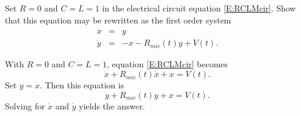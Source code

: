 \documentclass{ximera}
\begin{document}
\begin{exercise} \label{c14.3.4A}
Set $R=0$ and $C=L=1$ in the electrical circuit equation \eqref{E:RCLMcir}. 
Show that this equation may be rewritten as the first order system
\begin{equation} \label{E:ECsy}
\begin{array}{rcl}
\dot{x} & = & y \\
\dot{y} & = & -x -R_{mic}(t)y + V(t).
\end{array} 
\end{equation}

\begin{solution}

With $R=0$ and $C=L=1$, equation \eqref{E:RCLMcir} becomes
\[
\ddot{x} + R_{mic}(t)\dot{x} + x = V(t).
\]
Set $y=\dot{x}$.  Then this equation is
\[
\dot{y} + R_{mic}(t)y + x = V(t).
\]
Solving for $\dot{x}$ and $\dot{y}$ yields the answer. 

\end{solution}
\end{exercise}
\end{document}
